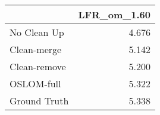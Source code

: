 \begin{tabular}{lr}
\toprule
{} & LFR_om_1.60 \\
\midrule
No Clean Up  &       4.676 \\
Clean-merge  &       5.142 \\
Clean-remove &       5.200 \\
OSLOM-full   &       5.322 \\
Ground Truth &       5.338 \\
\bottomrule
\end{tabular}
